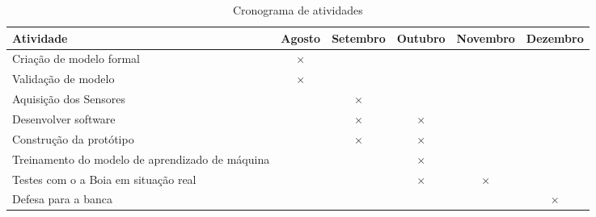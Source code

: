 \label{chapter:consideracoes}

\begin{table}[htbp]
  \centering
  \caption{Cronograma de atividades}
  \label{tab:cronograma}
  \begin{tabularx}{\textwidth}{|X|c|c|c|c|c|}
    \hline
    \textbf{Atividade} & \textbf{Agosto} & \textbf{Setembro} & \textbf{Outubro} & \textbf{Novembro} & \textbf{Dezembro} \\
    \hline
    Criação de modelo formal & \(\times\) & & & & \\
    \hline
    Validação de modelo & \(\times\) &  &  & & \\
    \hline
    Aquisição dos Sensores & & \(\times\)  &  & & \\
    \hline
    Desenvolver software & & \(\times\)  & \(\times\) & & \\
    \hline
    Construção da protótipo &  & \(\times\) &  \(\times\) & & \\
   \hline
    Treinamento do modelo de aprendizado de máquina & & & \(\times\) & &  \\
    \hline
    Testes com o a Boia em situação real & & & \(\times\) & \(\times\) &  \\
    \hline
    Defesa para a banca & & & & & \(\times\)  \\
    \hline
  \end{tabularx}
\end{table}